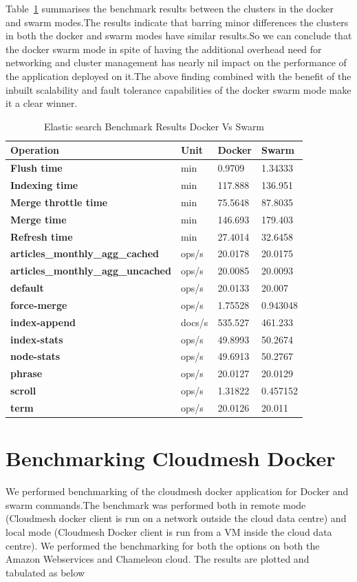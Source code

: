 \documentclass[9pt,twocolumn,twoside]{../../styles/osajnl}
\begin{document}
Table~\ref{tab:Esbenchmark} summarises the benchmark results between the clusters in the docker and swarm modes.The results indicate that barring minor differences the clusters in both the docker and swarm modes have similar results.So we can conclude that the docker swarm mode in spite of having the additional overhead need for networking and cluster management has nearly nil impact on the performance of the application deployed on it.The above finding combined with the benefit of the inbuilt scalability and fault tolerance capabilities of the docker swarm mode make it a clear winner.

\begin{table}[h]
\centering
\caption{Elastic search Benchmark Results Docker Vs Swarm}
\label{tab:Esbenchmark}
\begin{tabular}{|l|l|l|l|}
\hline
\textbf{Operation} & \textbf{Unit} & \textbf{Docker} & \textbf{Swarm} \\ \hline
\textbf{Flush time} & min & 0.9709 & 1.34333 \\
\textbf{Indexing time} & min & 117.888 & 136.951 \\
\textbf{Merge throttle time} & min & 75.5648 & 87.8035 \\
\textbf{Merge time} & min & 146.693 & 179.403 \\
\textbf{Refresh time} & min & 27.4014 & 32.6458 \\
\textbf{articles\_monthly\_agg\_cached} & ops/s & 20.0178 & 20.0175 \\
\textbf{articles\_monthly\_agg\_uncached} & ops/s & 20.0085 & 20.0093 \\
\textbf{default} & ops/s & 20.0133 & 20.007 \\
\textbf{force-merge} & ops/s & 1.75528 & 0.943048 \\
\textbf{index-append} & docs/s & 535.527 & 461.233 \\
\textbf{index-stats} & ops/s & 49.8993 & 50.2674 \\
\textbf{node-stats} & ops/s & 49.6913 & 50.2767 \\
\textbf{phrase} & ops/s & 20.0127 & 20.0129 \\
\textbf{scroll} & ops/s & 1.31822 & 0.457152 \\
\textbf{term} & ops/s & 20.0126 & 20.011\\
\hline
\end{tabular}
\end{table}
 
\section{Benchmarking Cloudmesh Docker} 
We performed benchmarking of the cloudmesh docker application for Docker and swarm commands.The benchmark was performed both in remote mode (Cloudmesh docker client is run on a network outside the cloud data centre) and local mode (Cloudmesh Docker client is run from a VM  inside the cloud data centre). We
performed the benchmarking for both the options on both the Amazon Webservices\cite{www-AWS} and Chameleon cloud\cite{www-Chameleon}.
The results are plotted and tabulated as below
\end{document}
